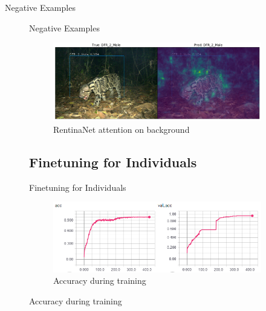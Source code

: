 \documentclass[10pt]{beamer}
\begin{document}
\begin{frame}{Negative Examples}
\begin{figure}

\begin{frame}{Negative Examples}
	\centering
	\begin{figure}
		\includegraphics[width=\columnwidth]{images/RetinaNet_No_Attention_correct2.png}
		\caption{RentinaNet attention on background}
	\end{figure}
\end{frame}

\subsection{Finetuning for Individuals}

\begin{frame}{Finetuning for Individuals}
	\centering
	\begin{figure}
		\includegraphics[width=.9\columnwidth,height=\textheight,keepaspectratio]{images/Acc_finetune_leo_both.png}
		\caption{Accuracy during training}
	\end{figure}
\end{frame}



\end{figure}
\end{frame}
\end{document}
